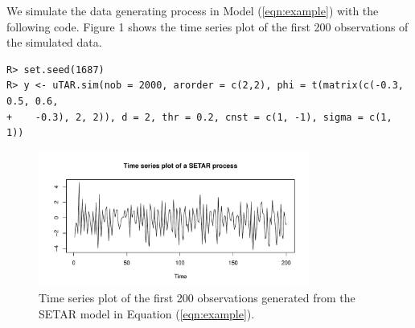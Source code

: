 We simulate the data generating process in Model (\ref{eqn:example}) with the following code. Figure 1 shows the time series plot of the first 200 observations of the simulated data. 

\begin{verbatim}
R> set.seed(1687)
R> y <- uTAR.sim(nob = 2000, arorder = c(2,2), phi = t(matrix(c(-0.3, 0.5, 0.6,
+    -0.3), 2, 2)), d = 2, thr = 0.2, cnst = c(1, -1), sigma = c(1, 1))
\end{verbatim}
\begin{figure}[ht!]
\centering
\includegraphics[width=3.5in]{SETAR}
\caption{Time series plot of the first 200 observations generated from the SETAR model in Equation (\ref{eqn:example}).}
\end{figure}


